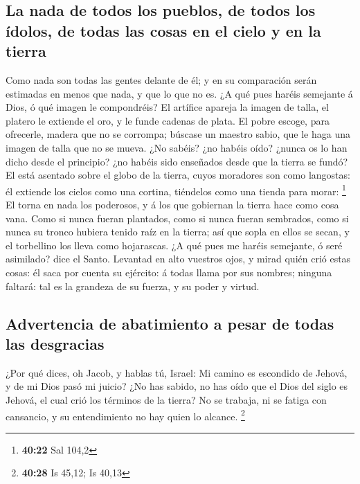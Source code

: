 \hypertarget{la-nada-de-todos-los-pueblos-de-todos-los-uxeddolos-de-todas-las-cosas-en-el-cielo-y-en-la-tierra}{%
\subsection{La nada de todos los pueblos, de todos los ídolos, de todas
las cosas en el cielo y en la
tierra}\label{la-nada-de-todos-los-pueblos-de-todos-los-uxeddolos-de-todas-las-cosas-en-el-cielo-y-en-la-tierra}}

 Como nada son todas las gentes delante de él; y en su
comparación serán estimadas en menos que nada, y que lo que no es.
 ¿A qué pues haréis semejante á Dios, ó qué imagen le
compondréis?  El artífice apareja la imagen de talla, el
platero le extiende el oro, y le funde cadenas de plata. 
El pobre escoge, para ofrecerle, madera que no se corrompa; búscase un
maestro sabio, que le haga una imagen de talla que no se mueva.
 ¿No sabéis? ¿no habéis oído? ¿nunca os lo han dicho desde
el principio? ¿no habéis sido enseñados desde que la tierra se fundó?
 El está asentado sobre el globo de la tierra, cuyos
moradores son como langostas: él extiende los cielos como una cortina,
tiéndelos como una tienda para morar: \footnote{\textbf{40:22} Sal 104,2}
 El torna en nada los poderosos, y á los que gobiernan la
tierra hace como cosa vana.  Como si nunca fueran
plantados, como si nunca fueran sembrados, como si nunca su tronco
hubiera tenido raíz en la tierra; así que sopla en ellos se secan, y el
torbellino los lleva como hojarascas.  ¿A qué pues me
haréis semejante, ó seré asimilado? dice el Santo. 
Levantad en alto vuestros ojos, y mirad quién crió estas cosas: él saca
por cuenta su ejército: á todas llama por sus nombres; ninguna faltará:
tal es la grandeza de su fuerza, y su poder y virtud.

\hypertarget{advertencia-de-abatimiento-a-pesar-de-todas-las-desgracias}{%
\subsection{Advertencia de abatimiento a pesar de todas las
desgracias}\label{advertencia-de-abatimiento-a-pesar-de-todas-las-desgracias}}

 ¿Por qué dices, oh Jacob, y hablas tú, Israel: Mi camino
es escondido de Jehová, y de mi Dios pasó mi juicio?  ¿No
has sabido, no has oído que el Dios del siglo es Jehová, el cual crió
los términos de la tierra? No se trabaja, ni se fatiga con cansancio, y
su entendimiento no hay quien lo alcance. \footnote{\textbf{40:28} Is
  45,12; Is 40,13}


